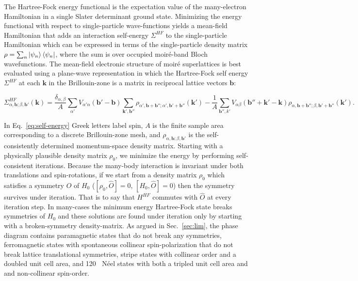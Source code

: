 \documentclass[%
 reprint,
 superscriptaddress,
 amsmath,amssymb,
 aps,
 prx,
 floatfix,
]{revtex4-2}
\newcommand{\<}{\langle}
\renewcommand{\>}{\rangle}
\renewcommand{\(}{\left(}
\renewcommand{\)}{\right)}
\renewcommand{\[}{\left[}
\renewcommand{\]}{\right]}
\renewcommand{\b}[1]{\mathbf{#1}} %
\DeclareMathOperator{\degree}{^{\circ}}
\begin{document}
The Hartree-Fock energy functional is the expectation value of the many-electron Hamiltonian in a 
single Slater determinant ground state.  Minimizing the energy functional with respect to 
single-particle wave-functions yields a mean-field Hamiltonian that adds an interaction self-energy 
$\Sigma^{HF}$ to the single-particle Hamiltonian which can be expressed 
in terms of the single-particle density matrix $\rho = \sum_{n} \ket{\psi_n}\bra{\psi_n}$, where the sum is 
over occupied moir\'e-band Bloch wavefunctions.  The mean-field electronic structure of moir\'e superlattices is best 
evaluated using a plane-wave representation in which the Hartree-Fock self energy $\Sigma^{HF}$ at each 
$\b{k}$ in the Brillouin-zone is a matrix in reciprocal lattice vectors $\b{b}$:
\begin{widetext}
\begin{equation}
    \Sigma^{HF}_{\alpha,\b{b};\beta,\b{b}'}(\b{k}) = \frac{\delta_{\alpha,\beta}}{A}\sum_{\alpha'}V_{\alpha'\alpha}(\b{b}'-\b{b})\sum_{\b{k}',\b{b}''}\rho_{\alpha',\b{b}+\b{b}'';\alpha',\b{b}'+\b{b}''}(\b{k}')  -\frac{1}{A}\sum_{\b{b}'',k'}V_{\alpha\beta}(\b{b}''+\b{k}'-\b{k})\rho_{\alpha,\b{b}+\b{b}'';\beta,\b{b}'+\b{b}''}(\b{k}').
\label{eq:self-energy}
\end{equation}
\end{widetext}
In Eq.~\ref{eq:self-energy} Greek letters label spin, $A$ is the finite sample area corresponding to a 
discrete Brillouin-zone mesh, and $\rho_{\alpha,\b{b};\beta,\b{b}'}$ is the self-consistently determined 
momentum-space density matrix.   Starting with a physically plausible density matrix $\rho_0$, we minimize the energy by performing self-consistent iterations. Because the many-body interaction is invariant under both translations and 
spin-rotations, if we start from a density matrix $\rho_0$ which satisfies a symmetry $\hat{O}$ of $H_0$ 
($[\rho_0,\hat{O}] = 0$, $[H_0,\hat{O}] = 0$) then the symmetry survives under iteration.  
That is to say that $H^{HF}$ commutes with $\hat{O}$ at every iteration step.  In many-cases the minimum 
energy Hartree-Fock state breaks symmetries of $H_0$ and these solutions are found under iteration only 
by starting with a broken-symmetry density-matrix. 
As argued in Sec.~\ref{sec:lim}, the phase diagram contains paramagnetic states that do not break 
any symmetries, ferromagnetic states with spontaneous 
collinear spin-polarization that do not break lattice translational symmetries,
stripe states with collinear order and a doubled unit cell area, 
and 120$\degree$ N\'eel states with both a tripled unit cell area and and non-collinear spin-order.
\end{document}
